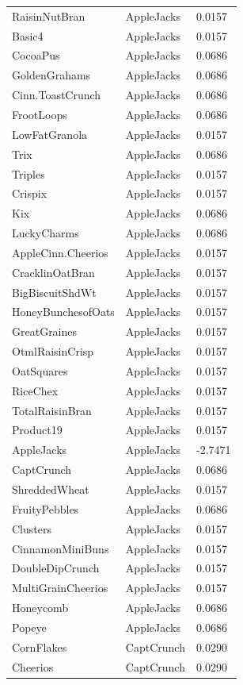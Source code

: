 \begin{table}[!htbp]
\begin{tabular}{lll}
RaisinNutBran & AppleJacks & 0.0157
\\
Basic4 & AppleJacks & 0.0157
\\
CocoaPus & AppleJacks & 0.0686
\\
GoldenGrahams & AppleJacks & 0.0686
\\
Cinn.ToastCrunch & AppleJacks & 0.0686
\\
FrootLoops & AppleJacks & 0.0686
\\
LowFatGranola & AppleJacks & 0.0157
\\
Trix & AppleJacks & 0.0686
\\
Triples & AppleJacks & 0.0157
\\
Crispix & AppleJacks & 0.0157
\\
Kix & AppleJacks & 0.0686
\\
LuckyCharms & AppleJacks & 0.0686
\\
AppleCinn.Cheerios & AppleJacks & 0.0157
\\
CracklinOatBran & AppleJacks & 0.0157
\\
BigBiscuitShdWt & AppleJacks & 0.0157
\\
HoneyBunchesofOats & AppleJacks & 0.0157
\\
GreatGraines & AppleJacks & 0.0157
\\
OtmlRaisinCrisp & AppleJacks & 0.0157
\\
OatSquares & AppleJacks & 0.0157
\\
RiceChex & AppleJacks & 0.0157
\\
TotalRaisinBran & AppleJacks & 0.0157
\\
Product19 & AppleJacks & 0.0157
\\
AppleJacks & AppleJacks & -2.7471
\\
CaptCrunch & AppleJacks & 0.0686
\\
ShreddedWheat & AppleJacks & 0.0157
\\
FruityPebbles & AppleJacks & 0.0686
\\
Clusters & AppleJacks & 0.0157
\\
CinnamonMiniBuns & AppleJacks & 0.0157
\\
DoubleDipCrunch & AppleJacks & 0.0157
\\
MultiGrainCheerios & AppleJacks & 0.0157
\\
Honeycomb & AppleJacks & 0.0686
\\
Popeye & AppleJacks & 0.0686
\\
CornFlakes & CaptCrunch & 0.0290
\\
Cheerios & CaptCrunch & 0.0290
\\

\end{tabular}
\end{table}
